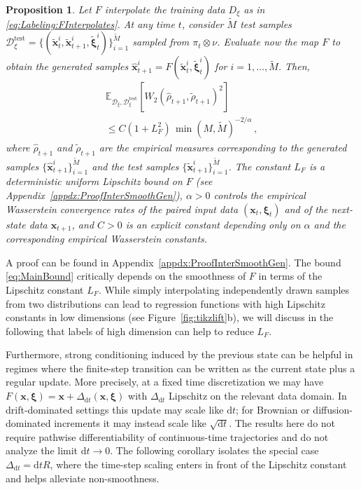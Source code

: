 \documentclass{article}
\theoremstyle{plain}
\newtheorem{proposition}[theorem]{Proposition}
\theoremstyle{definition}
\theoremstyle{remark}
\newcommand{\bfxi}{{\bm \xi}}
\newcommand{\x}{\bm{x}}
\newcommand{\bfx}{\bm{x}}
\newcommand{\rd}{\mathrm{d}}
\begin{document}
\begin{proposition}
  \label{prop:Main} Let $F$ interpolate the training data $D_{\xi}$ as in \eqref{eq:Labeling:FInterpolates}. At any time $t$, consider $\tilde{M}$ test samples $\mathcal{D}_{\xi}^{\text{test}} = \{(\tilde{\bfx}_t^i, \tilde{\bfx}_{t + 1}^i, \tilde{\bfxi}_t^i)\}_{i=1}^{\tilde{M}}$ sampled from $\pi_t \otimes \nu$. Evaluate now the map $F$ to obtain the generated samples $\hat{\bfx}_{t+1}^{i} = F(\tilde{\bfx}_t^i, \tilde{\bfxi}_t^i)$ for $i = 1, \dots, \tilde{M}$. Then,
  \begin{multline}
    \label{eq:MainBound}
    \mathbb E_{\mathcal{D}_{\xi}, \mathcal{D}_{\xi}^{\text{test}}} \left[ W_2( \hat{\rho}_{t + 1}, \tilde \rho_{t+1} )^2 \right] \\ \leq C ( 1 + L_F^2 ) \, {\min(M, \tilde M)}^{-2/\alpha} \,,
  \end{multline}
  where $\hat{\rho}_{t + 1}$ and $\tilde{\rho}_{t + 1}$ are the empirical measures corresponding to the generated samples $\{\hat{\bfx}_{t + 1}^i\}_{i = 1}^{\tilde{M}}$ and the test samples $\{\tilde{\bfx}_{t + 1}^i\}_{i = 1}^{\tilde{M}}$. The constant $L_F$ is a deterministic uniform Lipschitz bound on $F$ (see Appendix~\ref{appdx:ProofInterSmoothGen}), $\alpha > 0$ controls the empirical Wasserstein convergence rates of the paired input data $(\bfx_t, \bfxi_t)$ and of the next-state data $\bfx_{t+1}$, and $C > 0$ is an explicit constant depending only on $\alpha$ and the corresponding empirical Wasserstein constants.
\end{proposition}
A proof can be found in Appendix~\ref{appdx:ProofInterSmoothGen}. The bound \eqref{eq:MainBound} critically depends on the smoothness of $F$ in terms of the Lipschitz constant $L_F$. While simply interpolating independently drawn samples from two distributions can lead to regression functions with high Lipschitz constants in low dimensions (see Figure~\ref{fig:tikzlift}b), we will discuss in the following that  labels of high dimension can help to reduce $L_F$.

Furthermore, strong conditioning induced by the previous state can be helpful in regimes where the finite-step transition can be written as the current state plus a regular update. More precisely, at a fixed time discretization  we may have $F(\x, \bfxi)=\x + \Delta_{\mathrm dt}(\x,\bfxi)$ with $\Delta_{\rd t}$ Lipschitz on the relevant data domain. In drift-dominated settings this update may scale like $\rd t$; for Brownian or diffusion-dominated increments it may instead scale like $\sqrt{\rd t}$. The results here do not require pathwise differentiability of continuous-time trajectories and do not analyze the limit $\rd t \to 0$. The following corollary isolates the special case $\Delta_{\rd t}=\rd t R$, where the time-step scaling enters in front of the Lipschitz constant and helps alleviate non-smoothness.
\end{document}
